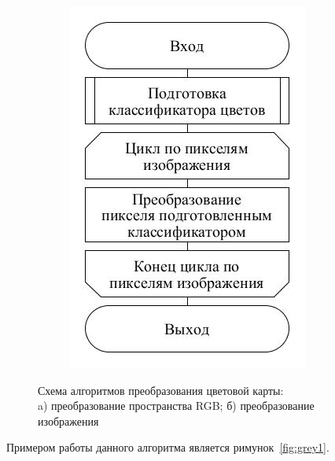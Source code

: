 \documentclass[14pt, a4paper]{extreport}
\begin{document}
\begin{figure}[h!]
\begin{subfigure}{.31\textwidth}
			\includegraphics[width = \textwidth]{image/chapter_2/colorclassification2}
			\caption{}
		\end{subfigure}
		\centering
		\caption{Схема алгоритмов преобразования цветовой карты: \\a) преобразование пространства RGB; б) преобразование изображения}
		\label{fig:colorclassification}
	\end{figure}
	Примером работы данного алгоритма является римунок~\ref{fig:grey1}.
\end{document}
